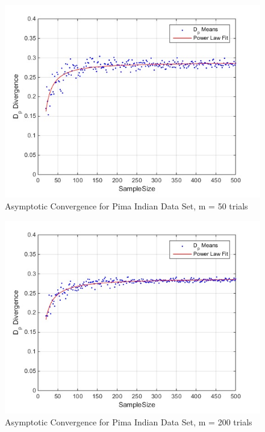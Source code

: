 \documentclass{article}
\begin{document}
\newpage
	\begin{figure}[!h]
		\caption{Asymptotic Convergence for Pima Indian Data Set, m = 50 trials}
		\centering
		\includegraphics[scale=0.4]{dp_n50_pima}
	\end{figure}
	\begin{figure}[!h]
		\caption{Asymptotic Convergence for Pima Indian Data Set, m = 200 trials}
		\centering
		\includegraphics[scale=0.4]{dp_n200_pima}
	\end{figure}	
\end{document}
